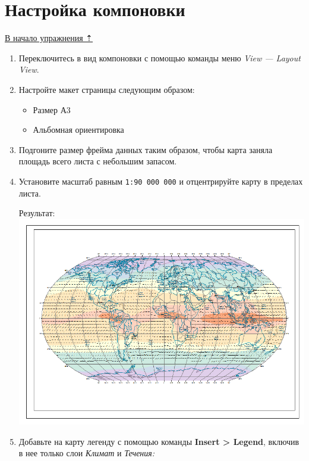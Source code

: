 \documentclass[]{book}
\providecommand{\tightlist}{%
  \setlength{\itemsep}{0pt}\setlength{\parskip}{0pt}}
\theoremstyle{definition}
\theoremstyle{definition}
\theoremstyle{definition}
\theoremstyle{remark}
\begin{document}
\hypertarget{map-design-climates-layout}{%
\section{Настройка компоновки}\label{map-design-climates-layout}}

\protect\hyperlink{map-design-climates}{В начало упражнения ⇡}

\begin{enumerate}
\def\labelenumi{\arabic{enumi}.}
\item
  Переключитесь в вид компоновки с помощью команды меню \emph{View ---
  Layout View}.
\item
  Настройте макет страницы следующим образом:

  \begin{itemize}
  \tightlist
  \item
    Размер А3
  \item
    Альбомная ориентировка
  \end{itemize}
\item
  Подгоните размер фрейма данных таким образом, чтобы карта заняла
  площадь всего листа с небольшим запасом.
\item
  Установите масштаб равным \texttt{1:90\ 000\ 000} и отцентрируйте
  карту в пределах листа.

  Результат: \includegraphics{images/Ex03/image30.png}
\item
  Добавьте на карту легенду с помощью команды \textbf{Insert
  \textgreater{} Legend}, включив в нее только слои \emph{Климат} и
  \emph{Течения:}


\end{enumerate}
\end{document}
